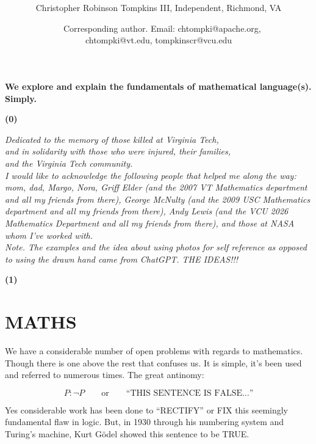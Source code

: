 \documentclass[12pt]{article}
\date{}
\title{\bfseries \boldmath \scititle}
\author{
    Christopher Robinson Tompkins III, Independent, Richmond, VA\and\
%
    Corresponding author. Email: chtompki@apache.org,\\ chtompki@vt.edu, tompkinscr@vcu.edu
}
\renewenvironment{abstract}
{\quotation}
{\endquotation}
\begin{document}
    \maketitle

    \begin{abstract} \bfseries \boldmath
        We explore and explain the fundamentals of mathematical language(s). Simply.
    \end{abstract}


    \textbf{(0)}
    \begin{center}
        \emph{Dedicated to the memory of those killed at Virginia Tech,\\
        and in solidarity with those who were injured, their families,\\
        and the Virginia Tech community.}
        \qquad\\
        \emph{I would like to acknowledge the following people that helped me along the way: mom, dad, Margo, Nora,
            Griff Elder (and the 2007 VT Mathematics department and all my friends from there), George McNulty (and the 2009 USC Mathematics department and all my friends from there),
            Andy Lewis (and the VCU 2026 Mathematics Department and all my friends from there), and those at NASA whom I've worked with.}
        \qquad\\
        \emph{Note. The examples and the idea about using photos for self reference as opposed to using the drawn
        hand came from ChatGPT. THE IDEAS!!!}
    \end{center}

    \newpage
    \textbf{(1)}
    \section*{MATHS}

    We have a considerable number of open problems with regards to mathematics.
    Though there is one above the rest that confuses us. It is simple, it's been
    used and referred to numerous times.
    The great antinomy:

    \[
        P:\neg P
        \qquad\text{or}\qquad
        \text{``THIS SENTENCE IS FALSE\ldots''}
    \]

    Yes considerable work has been done to ``RECTIFY'' or FIX this seemingly
    fundamental flaw in logic.
    But, in 1930 through his numbering system and
    Turing's machine, Kurt G\"odel showed this sentence to be TRUE.
\end{document}
